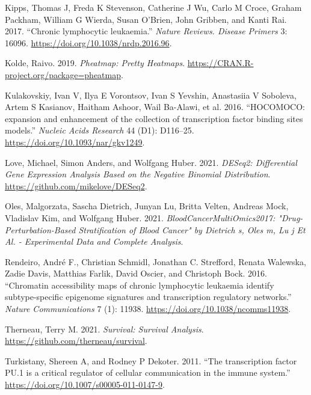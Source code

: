 \documentclass[11pt, a4paper, twosided]{book}
\newenvironment{CSLReferences}%
  {}%
  {\par}
\begin{document}
\begin{CSLReferences}{1}{0}
\leavevmode{}%
Kipps, Thomas J, Freda K Stevenson, Catherine J Wu, Carlo M Croce, Graham Packham, William G Wierda, Susan O'Brien, John Gribben, and Kanti Rai. 2017. {``{Chronic lymphocytic leukaemia.}''} \emph{Nature Reviews. Disease Primers} 3: 16096. \url{https://doi.org/10.1038/nrdp.2016.96}.

\leavevmode{}%
Kolde, Raivo. 2019. \emph{Pheatmap: Pretty Heatmaps}. \url{https://CRAN.R-project.org/package=pheatmap}.

\leavevmode{}%
Kulakovskiy, Ivan V, Ilya E Vorontsov, Ivan S Yevshin, Anastasiia V Soboleva, Artem S Kasianov, Haitham Ashoor, Wail Ba-Alawi, et al. 2016. {``{HOCOMOCO: expansion and enhancement of the collection of transcription factor binding sites models.}''} \emph{Nucleic Acids Research} 44 (D1): D116--25. \url{https://doi.org/10.1093/nar/gkv1249}.

\leavevmode{}%
Love, Michael, Simon Anders, and Wolfgang Huber. 2021. \emph{DESeq2: Differential Gene Expression Analysis Based on the Negative Binomial Distribution}. \url{https://github.com/mikelove/DESeq2}.

\leavevmode{}%
Oles, Malgorzata, Sascha Dietrich, Junyan Lu, Britta Velten, Andreas Mock, Vladislav Kim, and Wolfgang Huber. 2021. \emph{BloodCancerMultiOmics2017: "Drug-Perturbation-Based Stratification of Blood Cancer" by Dietrich s, Oles m, Lu j Et Al. - Experimental Data and Complete Analysis}.

\leavevmode{}%
Rendeiro, André F., Christian Schmidl, Jonathan C. Strefford, Renata Walewska, Zadie Davis, Matthias Farlik, David Oscier, and Christoph Bock. 2016. {``{Chromatin accessibility maps of chronic lymphocytic leukaemia identify subtype-specific epigenome signatures and transcription regulatory networks}.''} \emph{Nature Communications} 7 (1): 11938. \url{https://doi.org/10.1038/ncomms11938}.

\leavevmode{}%
Therneau, Terry M. 2021. \emph{Survival: Survival Analysis}. \url{https://github.com/therneau/survival}.

\leavevmode{}%
Turkistany, Shereen A, and Rodney P Dekoter. 2011. {``{The transcription factor PU.1 is a critical regulator of cellular communication in the immune system}.''} \url{https://doi.org/10.1007/s00005-011-0147-9}.


\end{CSLReferences}
\end{document}
